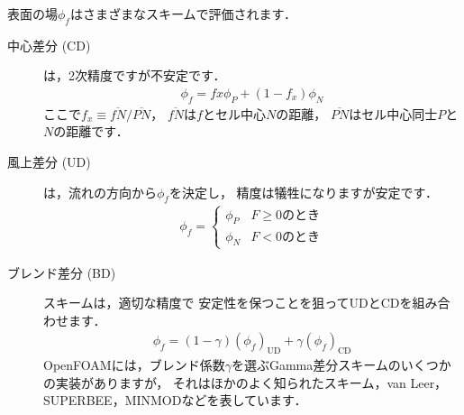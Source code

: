 表面の場$\phi_{f}$はさまざまなスキームで評価されます．
\begin{description}
 \item[中心差分 (CD)] は，2次精度ですが不安定です．
            \begin{align}
             \label{eq:2.17}
             \phi_{f} = f{x}\phi_{P} + (1 - f_{x})\phi_{N}
            \end{align}
            ここで$f_{x} \equiv \overline{fN}/\overline{PN}$，
            $\overline{fN}$は$f$とセル中心$N$の距離，
            $\overline{PN}$はセル中心同士$P$と$N$の距離です．
 \item[風上差分 (UD)] は，流れの方向から$\phi_{f}$を決定し，
            精度は犠牲になりますが安定です．
            \begin{align}
             \label{eq:2.18}
             \phi_{f} =
             \begin{cases}
              \phi_{P} & F \ge 0 \text{のとき} \\
              \phi_{N} & F < 0 \text{のとき}
             \end{cases}
            \end{align}
 \item[ブレンド差分 (BD)] スキームは，適切な精度で
            安定性を保つことを狙ってUDとCDを組み合わせます．
            \begin{align}
             \phi_{f} = (1 - \gamma)(\phi_{f})_{\mathrm{UD}} + \gamma(\phi_{f})_{\mathrm{CD}}
            \end{align}
            OpenFOAMには，ブレンド係数$\gamma$を選ぶGamma差分スキームのいくつかの実装がありますが，
            それはほかのよく知られたスキーム，van Leer，SUPERBEE，MINMODなどを表しています．
\end{description}


